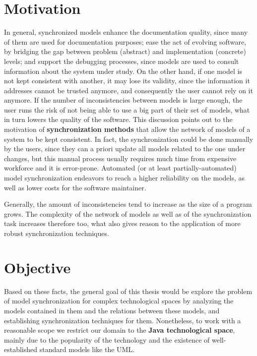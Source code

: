 \documentclass[tuberlin,cic,tc,english,noabntcite,oneside]{iiufrgs}
\begin{document}
\section{Motivation}
In general, synchronized models enhance the documentation quality, since many of them are used for documentation purposes; ease the act of evolving software, by bridging the gap between problem (abstract) and implementation (concrete) levels; and support the debugging processes, since models are used to consult information about the system under study. On the other hand, if one model is not kept consistent with another, it may lose its validity, since the information it addresses cannot be trusted anymore, and consequently the user cannot rely on it anymore. If the number of inconsistencies between models is large enough, the user runs the risk of not being able to use a big part of their set of models, what in turn lowers the quality of the software. This discussion points out to the motivation of \textbf{synchronization methods} that allow the network of models of a system to be kept consistent. In fact, the synchronization could be done manually by the users, since they can a priori update all models related to the one under changes, but this manual process usually requires much time from expensive workforce and it is error-prone. Automated (or at least partially-automated) model synchronization endeavors to reach a higher reliability on the models, as well as lower costs for the software maintainer.

Generally, the amount of inconsistencies tend to increase as the size of a program grows. The complexity of the network of models as well as of the synchronization task increases therefore too, what also gives reason to the application of more robust synchronization techniques. 

\section{Objective}
Based on these facts, the general goal of this thesis would be explore the problem of model synchronization for complex technological spaces by analyzing the models contained in them and the relations between these models, and establishing synchronization techniques for them. Nonetheless, to work with a reasonable scope we restrict our domain to the \textbf{Java technological space}, mainly due to the popularity of the technology and the existence of well-established standard models like the UML.
\end{document}
